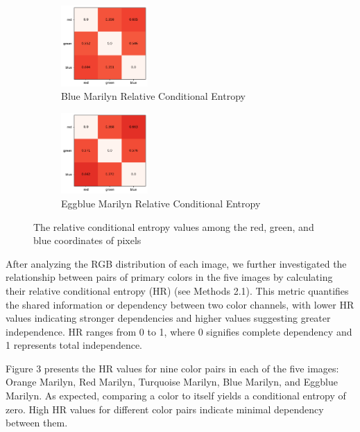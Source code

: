 \documentclass{article}
\begin{document}
\begin{figure}[ht]
  \begin{minipage}{0.6\textwidth}
    \centering
    \begin{subfigure}{0.45\textwidth}
      \centering
      \includegraphics[width=125px]{main_files/figure-latex/3_4_blue_marilyn_entropy.pdf}
      \caption{Blue Marilyn Relative Conditional Entropy}
      \label{fig:3_4_blue_marilyn_entropy}
    \end{subfigure}
    \hfill
    \begin{subfigure}{0.45\textwidth}
      \centering
      \includegraphics[width=125px]{main_files/figure-latex/3_5_eggblue_marilyn_entropy.pdf}
      \caption{Eggblue Marilyn Relative Conditional Entropy}
      \label{fig:3_5_eggblue_marilyn_entropy}
    \end{subfigure}
  \end{minipage}

  \caption{The relative conditional entropy values among the red, green, and blue coordinates of pixels}
  \label{fig:marilyn_entropy}
\end{figure}

After analyzing the RGB distribution of each image, we further
investigated the relationship between pairs of primary colors in the
five images by calculating their relative conditional entropy (HR) (see
Methods 2.1). This metric quantifies the shared information or
dependency between two color channels, with lower HR values indicating
stronger dependencies and higher values suggesting greater independence.
HR ranges from 0 to 1, where 0 signifies complete dependency and 1
represents total independence.

Figure 3 presents the HR values for nine color pairs in each of the five
images: Orange Marilyn, Red Marilyn, Turquoise Marilyn, Blue Marilyn,
and Eggblue Marilyn. As expected, comparing a color to itself yields a
conditional entropy of zero. High HR values for different color pairs
indicate minimal dependency between them.
\end{document}
